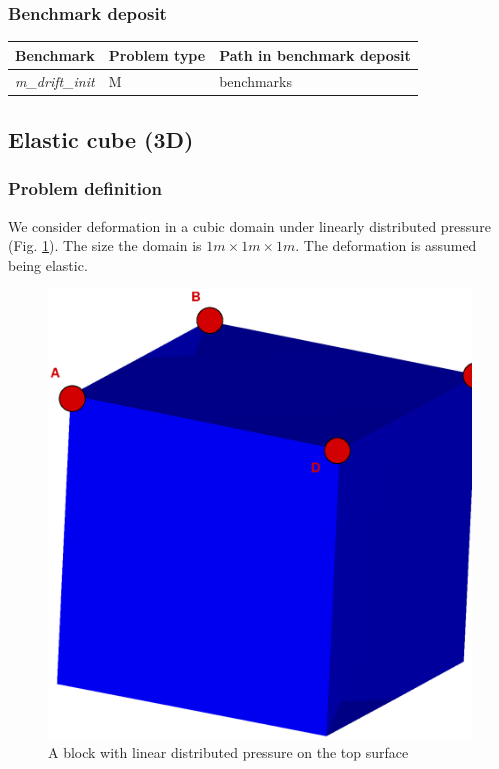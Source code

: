 \subsubsection*{Benchmark deposit}
\begin{tabular}{|l|l|l|}
  \hline
  Benchmark & Problem type & Path in benchmark deposit \\
  \hline
 \emph{m\_drift\_init} & M & benchmarks\verb \M\ \\
  \hline
\end{tabular}

\clearpage

\subsection{Elastic cube (3D)}
\subsubsection*{Problem definition}
We consider deformation in a cubic domain under linearly distributed pressure (Fig. \ref{fig:brick}).
The size the domain is $1m\times1m\times1m$. The deformation is assumed being elastic.
\begin{figure}[!htb]
  \begin{center}
    \includegraphics[scale=0.3]{M/brick_l.eps}
  \end{center}
  \caption{A block with linear distributed pressure on the top surface}
  \label{fig:brick}
\end{figure}
